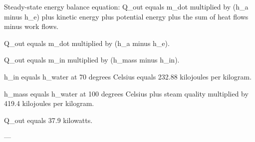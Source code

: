 Steady-state energy balance equation:  
Q_out equals m_dot multiplied by (h_a minus h_e) plus kinetic energy plus potential energy plus the sum of heat flows minus work flows.  

Q_out equals m_dot multiplied by (h_a minus h_e).  

Q_out equals m_in multiplied by (h_mass minus h_in).  

h_in equals h_water at 70 degrees Celsius equals 232.88 kilojoules per kilogram.  

h_mass equals h_water at 100 degrees Celsius plus steam quality multiplied by 419.4 kilojoules per kilogram.  

Q_out equals 37.9 kilowatts.  

---